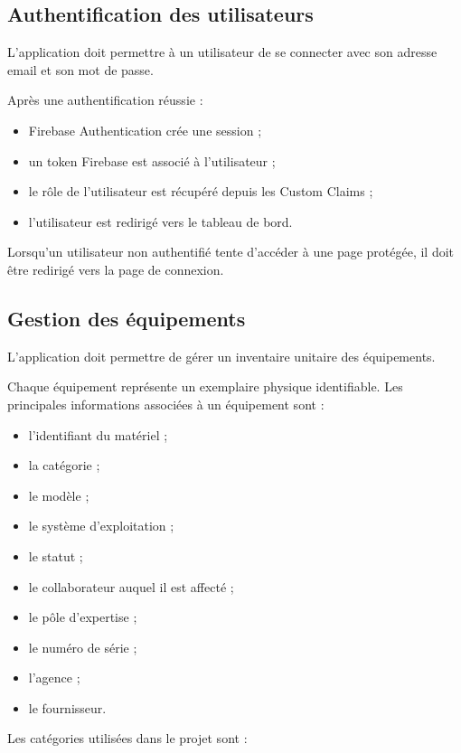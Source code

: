 \documentclass{rapportENSIAS}
\begin{document}
\subsection{Authentification des utilisateurs}

L’application doit permettre à un utilisateur de se connecter avec son adresse email et son mot de passe.

Après une authentification réussie :

\begin{itemize}
\item Firebase Authentication crée une session ;
\item un token Firebase est associé à l’utilisateur ;
\item le rôle de l’utilisateur est récupéré depuis les Custom Claims ;
\item l’utilisateur est redirigé vers le tableau de bord.
\end{itemize}

Lorsqu’un utilisateur non authentifié tente d’accéder à une page protégée, il doit être redirigé vers la page de connexion.

\subsection{Gestion des équipements}

L’application doit permettre de gérer un inventaire unitaire des équipements.

Chaque équipement représente un exemplaire physique identifiable. Les principales informations associées à un équipement sont :

\begin{itemize}
\item l’identifiant du matériel ;
\item la catégorie ;
\item le modèle ;
\item le système d’exploitation ;
\item le statut ;
\item le collaborateur auquel il est affecté ;
\item le pôle d’expertise ;
\item le numéro de série ;
\item l’agence ;
\item le fournisseur.
\end{itemize}

Les catégories utilisées dans le projet sont :
\end{document}
